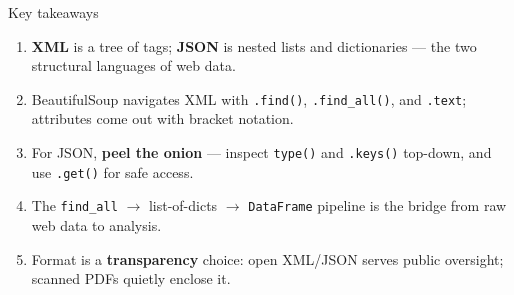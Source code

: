 \documentclass[9pt,aspectratio=169]{beamer}
\begin{document}
\begin{frame}{Key takeaways}
    \begin{enumerate}
        \item \textbf{XML} is a tree of tags; \textbf{JSON} is nested lists and dictionaries --- the two structural languages of web data.
        \item BeautifulSoup navigates XML with \texttt{.find()}, \texttt{.find\_all()}, and \texttt{.text}; attributes come out with bracket notation.
        \item For JSON, \textbf{peel the onion} --- inspect \texttt{type()} and \texttt{.keys()} top-down, and use \texttt{.get()} for safe access.
        \item The \texttt{find\_all} $\rightarrow$ list-of-dicts $\rightarrow$ \texttt{DataFrame} pipeline is the bridge from raw web data to analysis.
        \item Format is a \textbf{transparency} choice: open XML/JSON serves public oversight; scanned PDFs quietly enclose it.
    \end{enumerate}
    \vspace{0.75em}
\end{frame}
\end{document}
